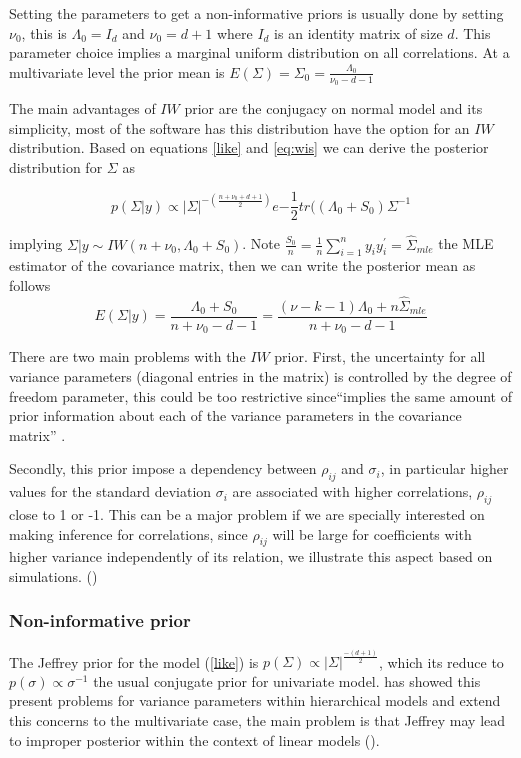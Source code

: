 \documentclass{article}
\begin{document}
Setting the parameters to get a non-informative priors is usually done by setting $\nu_0$, this is $\Lambda_0=I_d$ and $\nu_0=d+1$ where $I_d$ is an identity matrix of size $d$.  This parameter choice implies a marginal uniform distribution on all correlations.  At a multivariate level the prior mean is $E(\Sigma) = \Sigma_0= \frac{\Lambda_0}{\nu_0 - d - 1}$ 

The main advantages of $IW$ prior are the conjugacy on normal model and its simplicity, most of the software has this distribution have the option for an $IW$ distribution. Based on equations \ref{like} and \ref{eq:wis} we can derive the posterior distribution for $\Sigma$ as 

  \[
 p(\Sigma\vert y ) \propto |\Sigma|^{ -(\frac{n+\nu_0+d+1}{2} )} e{- \frac{1}{2} tr( (\Lambda_0+S_0)\Sigma^{-1} }
 \] 
 
implying $\Sigma \vert y \sim IW(n+\nu_0, \Lambda_0+S_0)$. Note $\frac{S_0}{n} = \frac{1}{n} \sum_{i=1}^n y_i y_i^{'} = \hat\Sigma_{mle}$ the MLE estimator of the covariance matrix, then we can write the posterior mean as follows 
\[  E(\Sigma\vert y) = \frac{\Lambda_0 + S_0}{n+\nu_0-d-1} = \frac{ (\nu - k-1)\Lambda_0 + n\hat\Sigma_{mle} } {n+\nu_0-d-1}  \] 

There are two main problems with the $IW$ prior. 
First, the uncertainty for all variance parameters (diagonal entries in the matrix) is controlled by the degree of freedom parameter, this could  be too restrictive since``implies the same amount of prior information about each of the variance parameters in the covariance matrix'' \cite{bda2003}. 

Secondly, this prior impose a dependency between $\rho_{ij}$ and $\sigma_i$, in particular higher values for the standard deviation $\sigma_i$ are associated with higher correlations, $\rho_{ij}$ close to 1 or -1.  This can be a major problem if we are specially interested on making inference for correlations, since $\rho_{ij}$ will be large for coefficients with higher variance independently of its relation,  we illustrate this aspect based on simulations. (\cite{visualize})

\subsubsection{Non-informative prior} 
The  Jeffrey prior for the model (\ref{like}) is $p(\Sigma)\propto |\Sigma| ^ {\frac{-(d+1)}{2} } $,  which its reduce to $p(\sigma) \propto \sigma^{-1}$  the usual conjugate prior for univariate model.  \cite{gelman2006prior} has showed this present problems for variance parameters within hierarchical models and \cite{SIW2008} extend this concerns to the multivariate case,  the main problem is that Jeffrey may lead to improper posterior within the context of linear models (\cite{SIW2008}).  
\end{document}
